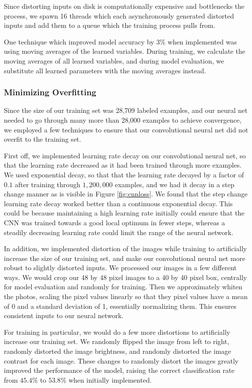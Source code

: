 \documentclass[11pt, twocolumn, twoside]{article}
\begin{document}
Since distorting inputs on disk is computationally expensive and bottlenecks the process, we spawn 16 threads which each asynchronously generated distorted inputs and add them to a queue which the training process pulls from.

One technique which improved model accuracy by $3\%$ when implemented was using moving averages of the learned variables. During training, we calculate the moving averages of all learned variables, and during model evaluation, we substitute all learned parameters with the moving averages instead.


\subsubsection{Minimizing Overfitting} \label{overfitting}

Since the size of our training set was 28,709 labeled examples, and our neural net needed to go through many more than 28,000 examples to achieve convergence, we employed a few techniques to ensure that our convolutional neural net did not overfit to the training set.

First off, we implemented learning rate decay on our convolutional neural net, so that the learning rate decreased as it had been trained through more examples. We used exponential decay, so that that the learning rate decayed by a factor of $0.1$ after training through $1,200,000$ examples, and we had it decay in a step change manner as is visible in Figure \ref{fig:cnnloss}. We found that the step change learning rate decay worked better than a continuous exponential decay. This could be because maintaining a high learning rate initially could ensure that the CNN was trained towards a good local optimum in fewer steps, whereas a steadily decreasing learning rate could limit the range of the neural network.

In addition, we implemented distortion of the images while training to artificially increase the size of our training set, and make our convolutional neural net more robust to slightly distorted inputs. We processed our images in a few different ways. We would crop our 48 by 48 pixel images to a 40 by 40 pixel box, centrally for model evaluation and randomly for training. Then we approximately whiten the photos, scaling the pixel values linearly so that they pixel values have a mean of 0 and a standard deviation of 1, essentially normalizing them. This ensures consistent inputs to our neural network.

For training in particular, we would do a few more distortions to artificially increase our training set. We randomly flipped the image from left to right, randomly distorted the image brightness, and 	randomly distorted the image contrast for each image. These changes to randomly distort the images greatly improved the performance of the model, raising the correct classification rate from $45.4\%$ to $53.8\%$ when initially implemented.
\end{document}
